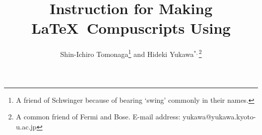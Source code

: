 \def\BS{\tt\symbol{"5C}}        %
\def\PTP{{\sl Progress of Theoretical Physics}}        %
\def\ttmac#1{{\tt \BS #1}}
\def\boxmac#1{\fbox{\ttmac{#1}}}
\def\boxenv#1{\fbox{\tt #1}}



\title{%
Instruction for Making \LaTeX\ Compuscripts Using \PTPTeX
}

\author{%
Shin-Ichiro {\sc Tomonaga}\footnote{A friend of Schwinger 
because of bearing `swing' commonly in their names.} 
and Hideki {\sc Yukawa}$^{*,}$\footnote{A common friend of Fermi and
Bose. E-mail address: yukawa@yukawa.kyoto-u.ac.jp}
}



